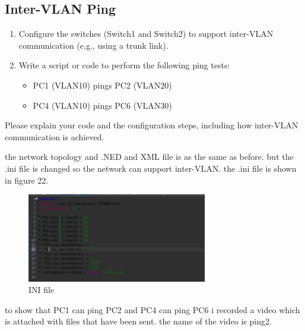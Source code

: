 \subsection{Inter-VLAN Ping}
\begin{enumerate}[label=\Roman*.]
    \item Configure the switches (Switch1 and Switch2) to support inter-VLAN communication (e.g., using a trunk link).
    \item Write a script or code to perform the following ping tests:
    \begin{itemize}
        \item PC1 (VLAN10) pings PC2 (VLAN20)
        \item PC4 (VLAN10) pings PC6 (VLAN30)
    \end{itemize}
\end{enumerate}

Please explain your code and the configuration steps, including how inter-VLAN communication is achieved.
\begin{qsolve}
    \begin{qsolve}[]
        the network topology and .NED and XML file is as the same as before. but the .ini file is changed so the network can support inter-VLAN. the .ini file is shown in figure 22.
        \begin{figure}[H]
            \centering
            \includegraphics[width=0.7\textwidth]{Q2_2ini.png}
            \caption{INI file}
        \end{figure}
        to show that PC1 can ping PC2 and PC4 can ping PC6 i recorded a video which is attached with files that have been sent. the name of the video is ping2.
    \end{qsolve}
\end{qsolve}